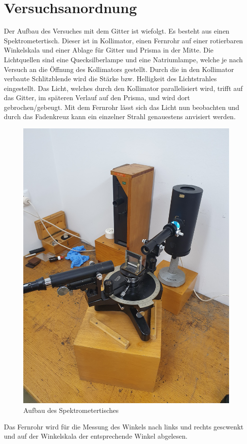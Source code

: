 \documentclass[12pt,a4paper,twoside]{article}
\begin{document}
\section{Versuchsanordnung} %
Der Aufbau des Versuches mit dem Gitter ist wiefolgt. Es besteht aus einen Spektrometertisch. Dieser ist in Kollimator, einen Fernrohr auf einer rotierbaren Winkelskala und einer Ablage für Gitter und Prisma in der Mitte. 
Die Lichtquellen sind eine Quecksilberlampe und eine Natriumlampe, welche je nach Versuch an die Öffnung des Kollimators gestellt. 
Durch die in den Kollimator verbaute Schlitzblende wird die Stärke bzw. Helligkeit des Lichtstrahles eingestellt. 
Das Licht, welches durch den Kollimator parallelisiert wird, trifft auf das Gitter, im späteren Verlauf auf den Prisma, und wird dort gebrochen/gebeugt. 
Mit dem Fernrohr lässt sich das Licht nun beobachten und durch das Fadenkreuz kann ein einzelner Strahl genauestens anvisiert werden. 

    \begin{figure}[H]
        \centering
        \includegraphics[width=0.6\linewidth, angle=-90]{nudes/versuch.jpg}
        \caption{Aufbau des Spektrometertisches}
        \label{fig:Aufbau}
    \end{figure}
\noindent
Das Fernrohr wird für die Messung des Winkels nach links und rechts gescwenkt und auf der Winkelskala der entsprechende Winkel abgelesen. 
\end{document}
